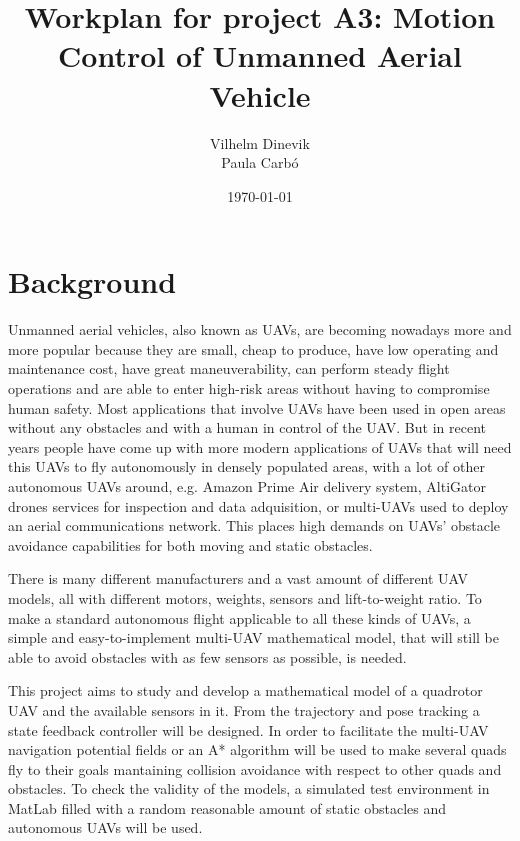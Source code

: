 \documentclass{article}
\title{Workplan for project A3: Motion Control of Unmanned Aerial Vehicle}
\author{Vilhelm Dinevik \\ Paula Carbó}
\date{\today}
\begin{document}
	\maketitle
	
	\bigskip
	\section{Background}
		Unmanned aerial vehicles, also known as UAVs, are becoming nowadays more and more popular because they are small, cheap to produce, have low operating and maintenance cost, have great maneuverability, can perform steady flight operations and are able to enter high-risk areas without having to compromise human safety. Most applications that involve UAVs have been used in open areas without any obstacles and with a human in control of the UAV. But in recent years people have come up with more modern applications of UAVs that will need this UAVs to fly autonomously in densely populated areas, with a lot of other autonomous UAVs around, e.g. Amazon Prime Air delivery system, AltiGator drones services for inspection and data adquisition, or multi-UAVs used to deploy an aerial communications network. This places high demands on UAVs’ obstacle avoidance capabilities for both moving and static obstacles.
		
		\vspace{1em}
		There is many different manufacturers and a vast amount of different UAV models, all with different motors, weights, sensors and lift-to-weight ratio. To make a standard autonomous flight applicable to all these kinds of UAVs, a simple and easy-to-implement multi-UAV mathematical model, that will still be able to avoid obstacles with as few sensors as possible, is needed.  
		
		\vspace{1em}
		This project aims to study and develop a mathematical model of a quadrotor UAV and the available sensors in it.  From the trajectory and pose tracking a state feedback controller will be designed. In order to facilitate the multi-UAV navigation potential fields or an A* algorithm will be used to make several quads fly to their goals mantaining collision avoidance with respect to other quads and obstacles. To check the validity of the models, a simulated test environment in MatLab filled with a random reasonable amount of static obstacles and autonomous UAVs will be used.
		
		
\end{document}
